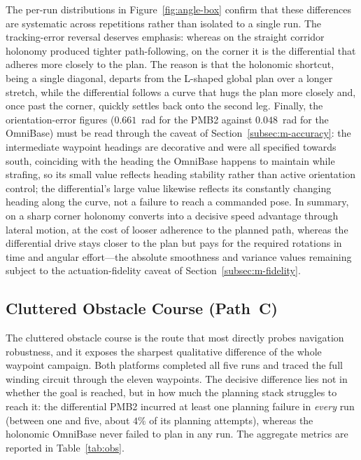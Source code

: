 The per-run distributions in Figure~\ref{fig:angle-box} confirm that these differences are systematic across repetitions rather than isolated to a single run. The tracking-error reversal deserves emphasis: whereas on the straight corridor holonomy produced tighter path-following, on the corner it is the differential that adheres more closely to the plan. The reason is that the holonomic shortcut, being a single diagonal, departs from the L-shaped global plan over a longer stretch, while the differential follows a curve that hugs the plan more closely and, once past the corner, quickly settles back onto the second leg. Finally, the orientation-error figures ($0.661$~rad for the PMB2 against $0.048$~rad for the OmniBase) must be read through the caveat of Section~\ref{subsec:m-accuracy}: the intermediate waypoint headings are decorative and were all specified towards south, coinciding with the heading the OmniBase happens to maintain while strafing, so its small value reflects heading stability rather than active orientation control; the differential's large value likewise reflects its constantly changing heading along the curve, not a failure to reach a commanded pose. In summary, on a sharp corner holonomy converts into a decisive speed advantage through lateral motion, at the cost of looser adherence to the planned path, whereas the differential drive stays closer to the plan but pays for the required rotations in time and angular effort---the absolute smoothness and variance values remaining subject to the actuation-fidelity caveat of Section~\ref{subsec:m-fidelity}.

\subsection{Cluttered Obstacle Course (Path~C)}
\label{subsec:res-obstacles}

The cluttered obstacle course is the route that most directly probes navigation robustness, and it exposes the sharpest qualitative difference of the whole waypoint campaign. Both platforms completed all five runs and traced the full winding circuit through the eleven waypoints. The decisive difference lies not in whether the goal is reached, but in how much the planning stack struggles to reach it: the differential PMB2 incurred at least one planning failure in \emph{every} run (between one and five, about $4\%$ of its planning attempts), whereas the holonomic OmniBase never failed to plan in any run. The aggregate metrics are reported in Table~\ref{tab:obs}.


